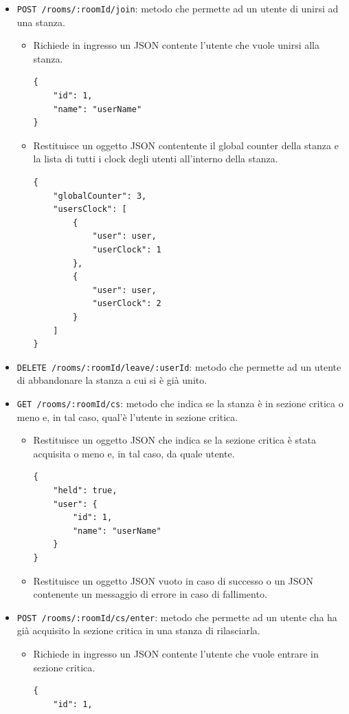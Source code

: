 \documentclass[a4paper]{article}
\begin{document}
\begin{itemize}
    \item \texttt{POST /rooms/:roomId/join}: metodo che permette ad un utente di unirsi ad una stanza.
    \begin{itemize}
        \item Richiede in ingresso un JSON contente l'utente che vuole unirsi alla stanza.
        \begin{verbatim}
{
    "id": 1,
    "name": "userName"
}
        \end{verbatim}
        \item Restituisce un oggetto JSON contentente il global counter della stanza e la lista di tutti i clock degli utenti all'interno della stanza.
        \begin{verbatim}
{
    "globalCounter": 3,
    "usersClock": [
        {
            "user": user,
            "userClock": 1
        },
        {
            "user": user,
            "userClock": 2
        }
    ]
}
        \end{verbatim}
    \end{itemize}
    \item \texttt{DELETE /rooms/:roomId/leave/:userId}: metodo che permette ad un utente di abbandonare la stanza a cui si è già unito.
    \item \texttt{GET /rooms/:roomId/cs}: metodo che indica se la stanza è in sezione critica o meno e, in tal caso, qual'è l'utente in sezione critica.
    \begin{itemize}
        \item Restituisce un oggetto JSON che indica se la sezione critica è stata acquisita o meno e, in tal caso, da quale utente.
        \begin{verbatim}
{
    "held": true,
    "user": {
        "id": 1,
        "name": "userName"
    }
}
        \end{verbatim}
        \item Restituisce un oggetto JSON vuoto in caso di successo o un JSON contenente un messaggio di errore in caso di fallimento.
    \end{itemize}
    \item \texttt{POST /rooms/:roomId/cs/enter}: metodo che permette ad un utente cha ha già acquisito la sezione critica in una stanza di rilasciarla.
    \begin{itemize}
        \item Richiede in ingresso un JSON contente l'utente che vuole entrare in sezione critica.
        \begin{verbatim}
{
    "id": 1,

\end{verbatim}
\end{itemize}
\end{itemize}
\end{document}

